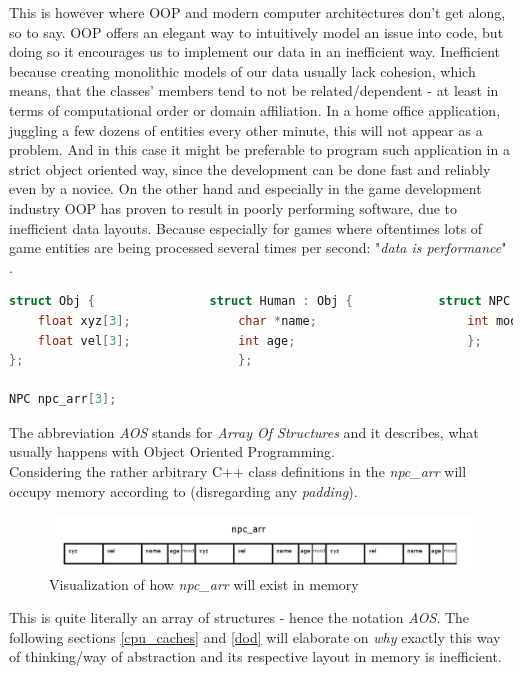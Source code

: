  This is however where OOP and modern computer architectures don't get along, so to say. OOP offers an elegant way to intuitively model an issue into code, but doing so it encourages us to implement our data in an inefficient way. Inefficient because creating monolithic models of our data usually lack cohesion, which means, that the classes' members tend to not be related/dependent  - at least in terms of computational order or domain affiliation. In a home office application, juggling a few dozens of entities every other minute, this will not appear as a problem. And in this case it might be preferable to program such application in a strict object oriented way, since the development can be done fast and reliably even by a novice. On the other hand and especially in the game development industry OOP has proven to result in poorly performing software, due to inefficient data layouts. Because especially for games where oftentimes lots of game entities are being processed several times per second: "\textit{data is performance}" .\\
 \begin{lstlisting}[language=C++,numbers=none,name={Example of some hierarchical POD class definitions},label={pods}]
struct Obj {				struct Human : Obj {			struct NPC : Human {
	float xyz[3];				char *name;						int mood;
	float vel[3];				int age;						};
};								};

NPC npc_arr[3];
 \end{lstlisting}
The abbreviation \textit{AOS} stands for \textit{Array Of Structures} and it describes, what usually happens with Object Oriented Programming.\\
Considering the rather arbitrary C++ class definitions in  the \textit{npc\_arr} will occupy memory according to  (disregarding any \textit{padding}).
\begin{figure}[!htbp]
	\centering
	\includegraphics[width=1.0\linewidth]{PICs/npcs_in_memory}
	\caption{Visualization of how \textit{npc\_arr} will exist in memory}\label{npcs_in_memory}
\end{figure}
This is quite literally an array of structures - hence the notation \textit{AOS}. The following sections \ref{cpu_caches} and \ref{dod} will elaborate on \textit{why} exactly this way of thinking/way of abstraction and its respective layout in memory is inefficient.

